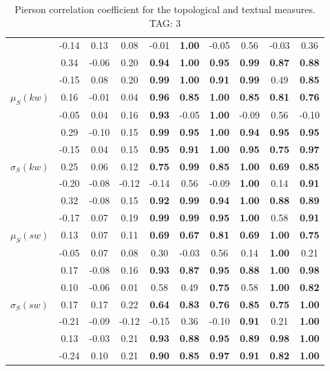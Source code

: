 \begin{table*}[h!]
\begin{center}
\begin{tabular}{| l || c | c | c | c | c | c | c | c | c |}
 & -0.14 & 0.13 & 0.08 & -0.01 & {\bf 1.00} & -0.05 & 0.56 & -0.03 & 0.36 \\
 & 0.34 & -0.06 & 0.20 & {\bf 0.94} & {\bf 1.00} & {\bf 0.95} & {\bf 0.99} & {\bf 0.87} & {\bf 0.88} \\
 & -0.15 & 0.08 & 0.20 & {\bf 0.99} & {\bf 1.00} & {\bf 0.91} & {\bf 0.99} & 0.49 & {\bf 0.85} \\\hline
$\mu_S(kw)$ & 0.16 & -0.01 & 0.04 & {\bf 0.96} & {\bf 0.85} & {\bf 1.00} & {\bf 0.85} & {\bf 0.81} & {\bf 0.76} \\
 & -0.05 & 0.04 & 0.16 & {\bf 0.93} & -0.05 & {\bf 1.00} & -0.09 & 0.56 & -0.10 \\
 & 0.29 & -0.10 & 0.15 & {\bf 0.99} & {\bf 0.95} & {\bf 1.00} & {\bf 0.94} & {\bf 0.95} & {\bf 0.95} \\
 & -0.15 & 0.04 & 0.15 & {\bf 0.95} & {\bf 0.91} & {\bf 1.00} & {\bf 0.95} & {\bf 0.75} & {\bf 0.97} \\\hline
$\sigma_S(kw)$ & 0.25 & 0.06 & 0.12 & {\bf 0.75} & {\bf 0.99} & {\bf 0.85} & {\bf 1.00} & {\bf 0.69} & {\bf 0.85} \\
 & -0.20 & -0.08 & -0.12 & -0.14 & 0.56 & -0.09 & {\bf 1.00} & 0.14 & {\bf 0.91} \\
 & 0.32 & -0.08 & 0.15 & {\bf 0.92} & {\bf 0.99} & {\bf 0.94} & {\bf 1.00} & {\bf 0.88} & {\bf 0.89} \\
 & -0.17 & 0.07 & 0.19 & {\bf 0.99} & {\bf 0.99} & {\bf 0.95} & {\bf 1.00} & 0.58 & {\bf 0.91} \\\hline
$\mu_S(sw)$ & 0.13 & 0.07 & 0.11 & {\bf 0.69} & {\bf 0.67} & {\bf 0.81} & {\bf 0.69} & {\bf 1.00} & {\bf 0.75} \\
 & -0.05 & 0.07 & 0.08 & 0.30 & -0.03 & 0.56 & 0.14 & {\bf 1.00} & 0.21 \\
 & 0.17 & -0.08 & 0.16 & {\bf 0.93} & {\bf 0.87} & {\bf 0.95} & {\bf 0.88} & {\bf 1.00} & {\bf 0.98} \\
 & 0.10 & -0.06 & 0.01 & 0.58 & 0.49 & {\bf 0.75} & 0.58 & {\bf 1.00} & {\bf 0.82} \\\hline
$\sigma_S(sw)$ & 0.17 & 0.17 & 0.22 & {\bf 0.64} & {\bf 0.83} & {\bf 0.76} & {\bf 0.85} & {\bf 0.75} & {\bf 1.00} \\
 & -0.21 & -0.09 & -0.12 & -0.15 & 0.36 & -0.10 & {\bf 0.91} & 0.21 & {\bf 1.00} \\
 & 0.13 & -0.03 & 0.21 & {\bf 0.93} & {\bf 0.88} & {\bf 0.95} & {\bf 0.89} & {\bf 0.98} & {\bf 1.00} \\
 & -0.24 & 0.10 & 0.21 & {\bf 0.90} & {\bf 0.85} & {\bf 0.97} & {\bf 0.91} & {\bf 0.82} & {\bf 1.00} \\\hline
\end{tabular}
\caption{Pierson correlation coefficient for the topological and textual measures. TAG: 3}
\end{center}
\end{table*}